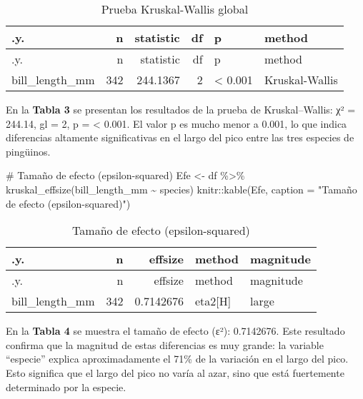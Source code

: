 \documentclass[
  spanish,
  11pt,
  a4paper,
  DIV=11,
  numbers=noendperiod]{scrartcl}
\newenvironment{Shaded}{\begin{snugshade}}{\end{snugshade}}
\newcommand{\AttributeTok}[1]{\textcolor[rgb]{0.40,0.45,0.13}{#1}}
\newcommand{\CommentTok}[1]{\textcolor[rgb]{0.37,0.37,0.37}{#1}}
\newcommand{\FunctionTok}[1]{\textcolor[rgb]{0.28,0.35,0.67}{#1}}
\newcommand{\NormalTok}[1]{\textcolor[rgb]{0.00,0.23,0.31}{#1}}
\newcommand{\OtherTok}[1]{\textcolor[rgb]{0.00,0.23,0.31}{#1}}
\newcommand{\SpecialCharTok}[1]{\textcolor[rgb]{0.37,0.37,0.37}{#1}}
\newcommand{\StringTok}[1]{\textcolor[rgb]{0.13,0.47,0.30}{#1}}
\begin{document}
\begin{longtable}[]{@{}lrrrll@{}}
\caption{Prueba Kruskal-Wallis global}\tabularnewline
\toprule\noalign{}
.y. & n & statistic & df & p & method \\
\midrule\noalign{}
\endfirsthead
\toprule\noalign{}
.y. & n & statistic & df & p & method \\
\midrule\noalign{}
\endhead
\bottomrule\noalign{}
\endlastfoot
bill\_length\_mm & 342 & 244.1367 & 2 & \textless{} 0.001 &
Kruskal-Wallis \\
\end{longtable}

En la \textbf{Tabla 3} se presentan los resultados de la prueba de
Kruskal--Wallis: χ² = 244.14, gl = 2, p = \textless{} 0.001. El valor p
es mucho menor a 0.001, lo que indica diferencias altamente
significativas en el largo del pico entre las tres especies de
pingüinos.

\begin{Shaded}
\begin{Highlighting}[numbers=left,,]
\CommentTok{\# Tamaño de efecto (epsilon{-}squared)}
\NormalTok{Efe }\OtherTok{\textless{}{-}}\NormalTok{ df }\SpecialCharTok{\%\textgreater{}\%} \FunctionTok{kruskal\_effsize}\NormalTok{(bill\_length\_mm }\SpecialCharTok{\textasciitilde{}}\NormalTok{ species)}
\NormalTok{knitr}\SpecialCharTok{::}\FunctionTok{kable}\NormalTok{(Efe, }\AttributeTok{caption =} \StringTok{"Tamaño de efecto (epsilon{-}squared)"}\NormalTok{)}
\end{Highlighting}
\end{Shaded}

\begin{longtable}[]{@{}lrrll@{}}
\caption{Tamaño de efecto (epsilon-squared)}\tabularnewline
\toprule\noalign{}
.y. & n & effsize & method & magnitude \\
\midrule\noalign{}
\endfirsthead
\toprule\noalign{}
.y. & n & effsize & method & magnitude \\
\midrule\noalign{}
\endhead
\bottomrule\noalign{}
\endlastfoot
bill\_length\_mm & 342 & 0.7142676 & eta2{[}H{]} & large \\
\end{longtable}

En la \textbf{Tabla 4} se muestra el tamaño de efecto (ε²): 0.7142676.
Este resultado confirma que la magnitud de estas diferencias es muy
grande: la variable ``especie'' explica aproximadamente el 71\% de la
variación en el largo del pico. Esto significa que el largo del pico no
varía al azar, sino que está fuertemente determinado por la especie.
\end{document}
